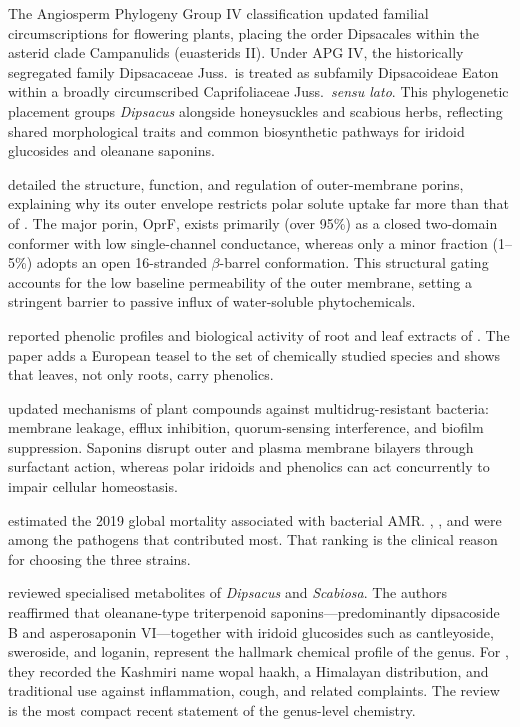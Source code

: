 The Angiosperm Phylogeny Group IV classification \citep{apgiv2016} updated familial circumscriptions for flowering plants, placing the order Dipsacales within the asterid clade Campanulids (euasterids II). Under APG IV, the historically segregated family Dipsacaceae Juss.\ is treated as subfamily Dipsacoideae Eaton within a broadly circumscribed Caprifoliaceae Juss.\ \textit{sensu lato}. This phylogenetic placement groups \textit{Dipsacus} alongside honeysuckles and scabious herbs, reflecting shared morphological traits and common biosynthetic pathways for iridoid glucosides and oleanane saponins.

\citet{chevalier2017porins} detailed the structure, function, and regulation of  outer-membrane porins, explaining why its outer envelope restricts polar solute uptake far more than that of . The major porin, OprF, exists primarily (over 95\%) as a closed two-domain conformer with low single-channel conductance, whereas only a minor fraction (1--5\%) adopts an open 16-stranded $\beta$-barrel conformation. This structural gating accounts for the low baseline permeability of the  outer membrane, setting a stringent barrier to passive influx of water-soluble phytochemicals.

\citet{oszmianski2020roots} reported phenolic profiles and biological activity of root and leaf extracts of . The paper adds a European teasel to the set of chemically studied species and shows that leaves, not only roots, carry phenolics.

\citet{jubair2021review} updated mechanisms of plant compounds against multidrug-resistant bacteria: membrane leakage, efflux inhibition, quorum-sensing interference, and biofilm suppression. Saponins disrupt outer and plasma membrane bilayers through surfactant action, whereas polar iridoids and phenolics can act concurrently to impair cellular homeostasis.

\citet{amrcollaborators2022global} estimated the 2019 global mortality associated with bacterial AMR. , , and  were among the pathogens that contributed most. That ranking is the clinical reason for choosing the three strains.

\citet{skala2023dipsacus} reviewed specialised metabolites of \textit{Dipsacus} and \textit{Scabiosa}. The authors reaffirmed that oleanane-type triterpenoid saponins---predominantly dipsacoside B and asperosaponin VI---together with iridoid glucosides such as cantleyoside, sweroside, and loganin, represent the hallmark chemical profile of the genus. For , they recorded the Kashmiri name wopal haakh, a Himalayan distribution, and traditional use against inflammation, cough, and related complaints. The review is the most compact recent statement of the genus-level chemistry.

